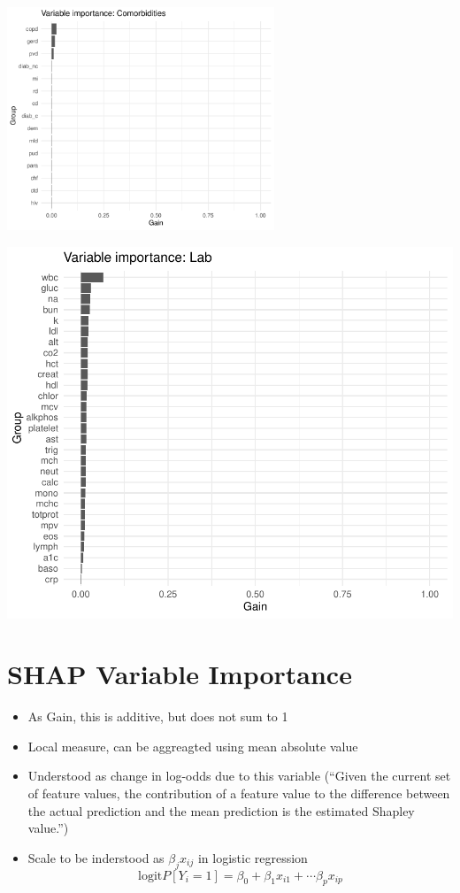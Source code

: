 \documentclass[12pt]{article}
\begin{document}
\begin{center}
\includegraphics[width=0.6\textwidth]{figures/pdp_new/vi_group_Comorbidities.pdf}
\end{center}
\begin{center}
\includegraphics[width=1.0\textwidth]{figures/pdp_new/vi_group_Lab.pdf}
\end{center}

\clearpage

\section*{SHAP Variable Importance}

\begin{itemize}
\item As Gain, this is  additive, but does not sum to 1
\item Local measure, can be aggreagted using mean absolute value 
\item Understood as change in log-odds due to this variable (``Given the current set of feature values, 
the contribution of a feature value to the difference between the actual prediction and the mean prediction is the estimated Shapley value.'')
\item Scale to be inderstood as $\beta_jx_{ij}$ in logistic regression $$\text{logit}P[Y_i=1] = \beta_0 + \beta_1x_{i1} + \cdots \beta_px_{ip}$$
\end{itemize}
\end{document}
